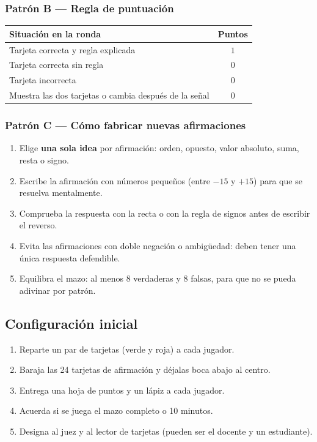 \documentclass[12pt, letterpaper]{article}
\begin{document}
\subsubsection{Patrón B — Regla de puntuación}

\begin{center}
\small
\begin{tabular}{@{}p{8.4cm} c@{}}
\toprule
\textbf{Situación en la ronda} & \textbf{Puntos}\\
\midrule
Tarjeta correcta y regla explicada & $1$\\
Tarjeta correcta sin regla & $0$\\
Tarjeta incorrecta & $0$\\
Muestra las dos tarjetas o cambia después de la señal & $0$\\
\bottomrule
\end{tabular}
\end{center}

\subsubsection{Patrón C — Cómo fabricar nuevas afirmaciones}

\begin{enumerate}[leftmargin=*]
  \item Elige \textbf{una sola idea} por afirmación: orden, opuesto, valor absoluto, suma, resta o signo.
  \item Escribe la afirmación con números pequeños (entre $-15$ y $+15$) para que se resuelva mentalmente.
  \item Comprueba la respuesta con la recta o con la regla de signos antes de escribir el reverso.
  \item Evita las afirmaciones con doble negación o ambigüedad: deben tener una única respuesta defendible.
  \item Equilibra el mazo: al menos 8 verdaderas y 8 falsas, para que no se pueda adivinar por patrón.
\end{enumerate}

\subsection{Configuración inicial}

\begin{enumerate}[leftmargin=*]
  \item Reparte un par de tarjetas (verde y roja) a cada jugador.
  \item Baraja las 24 tarjetas de afirmación y déjalas boca abajo al centro.
  \item Entrega una hoja de puntos y un lápiz a cada jugador.
  \item Acuerda si se juega el mazo completo o 10 minutos.
  \item Designa al juez y al lector de tarjetas (pueden ser el docente y un estudiante).
\end{enumerate}
\end{document}
